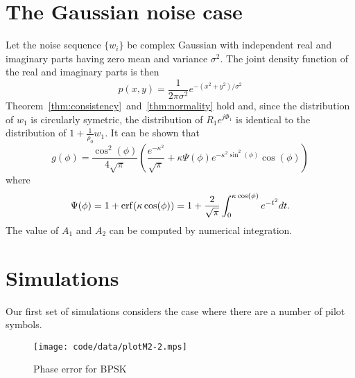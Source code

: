 \documentclass[journal]{IEEEtran}
\begin{document}
\section{The Gaussian noise case}

Let the noise sequence $\{w_i\}$ be complex Gaussian with independent real and imaginary parts having zero mean and variance $\sigma^2$.  The joint density function of the real and imaginary parts is then
\[
p(x,y) = \frac{1}{2\pi\sigma^2}e^{-(x^2 + y^2)/\sigma^2}
\]
Theorem~\ref{thm:consistency}~and~\ref{thm:normality} hold and, since the distribution of $w_1$ is circularly symetric, the distribution of $R_1e^{j\Phi_1}$ is identical to the distribution of $1 + \frac{1}{\rho_0} w_1$.
It can be shown that
\[
g(\phi) = \frac{\cos^2(\phi)}{4\sqrt{\pi}}\left( \frac{e^{-\kappa^2} }{\sqrt{\pi}} + \kappa \Psi(\phi)  e^{-\kappa^2\sin^2(\phi)}\cos(\phi) \right)
\]
where
\[
\Psi(\phi) = 1 + \operatorname{erf}(\kappa \cos(\phi)) = 1 + \frac{2}{\sqrt{\pi}}\int_0^{\kappa \cos(\phi)} e^{-t^2} dt .
\]
The value of $A_1$ and $A_2$ can be computed by numerical integration.


\section{Simulations}\label{sec:simulations}


Our first set of simulations considers the case where there are a number of pilot symbols.



\begin{figure}[tp]
	\centering
		\texttt{[image: code/data/plotM2-2.mps]}
		\caption{Phase error for BPSK}
		\label{fig:plotphase}
\end{figure}

\end{document}
